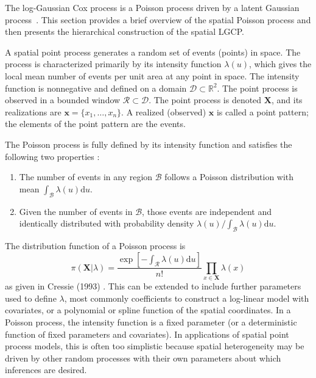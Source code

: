 \documentclass{interact}
\begin{document}
The log-Gaussian Cox process is a Poisson process driven by a latent Gaussian
process~\cite{moelleretal}. This section provides a brief overview of the
spatial Poisson process and then presents the hierarchical construction of the
spatial LGCP.

A spatial point process generates a random set of events (points) in space.
The process is characterized primarily by its intensity function
\(\lambda(u)\), which gives the local mean number of events per unit area at
any point in space. The intensity function is nonnegative and defined on a
domain \(\mathcal{D} \subset \mathbb{R}^{2}\). The point process is observed
in a bounded window \(\mathcal{R} \subset \mathcal{D}\). The point process is
denoted \(\mathbf{X}\), and its realizations are \(\mathbf{x} = \{x_{1},
\dots, x_{n}\}\). A realized (observed) \(\mathbf{x}\) is called a point
pattern; the elements of the point pattern are the events.

The Poisson process is fully defined by its intensity function and satisfies
the following two properties \cite{moellerwaagepetersen}:
\begin{enumerate}
\item The number of events in any region \(\mathcal{B}\) follows a Poisson
distribution with mean
\(\int_{\mathcal{B}} \lambda(u)\mathrm{d}u\).
\item Given the number of events in \(\mathcal{B}\), those events are
independent and identically distributed with probability density
\(\lambda(u) / \int_{\mathcal{B}} \lambda(u)\mathrm{d}u\).
\end{enumerate}
The distribution function of a Poisson process is
\begin{equation}
\pi(\mathbf{X}|\lambda)
= \frac{\exp\left[-\int_{\mathcal{R}} \lambda(u) \mathrm{d}u\right]}{n!}
\prod_{x \in \mathbf{X}} \lambda(x)
\end{equation}
as given in Cressie (1993) \cite{cressie}. This can be extended to include
further parameters used to define \(\lambda\), most commonly coefficients
to construct a log-linear model with covariates, or a polynomial or spline
function of the spatial coordinates. In a Poisson process, the intensity 
function is a fixed parameter (or a
deterministic function of fixed parameters and covariates). In applications of
spatial point process models, this is often too simplistic because spatial
heterogeneity may be driven by other random processes with their own parameters
about which inferences are desired.
\end{document}
